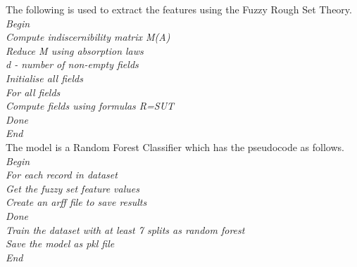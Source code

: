 The following is used to extract the features using the Fuzzy Rough Set Theory.\\
\null\quad\textit{Begin}\\
\null\quad\quad\textit{Compute indiscernibility matrix M(A)}\\
\null\quad\quad\textit{Reduce M using absorption laws}\\
\null\quad\quad\textit{d - number of non-empty fields}\\
\null\quad\quad\textit{Initialise all fields}\\
\null\quad\quad\textit{For all fields}\\
\null\quad\quad\quad\textit{Compute fields using formulas R=SUT}\\
\null\quad\quad\textit{Done}\\
\null\quad\textit{End}\\

The model is a Random Forest Classifier which has the pseudocode as follows.\\
\null\quad\textit{Begin}\\
\null\quad\quad\textit{For each record in dataset}\\
\null\quad\quad\quad\textit{Get the fuzzy set feature values}\\
\null\quad\quad\quad\textit{Create an arff file to save results}\\
\null\quad\quad\textit{Done}\\
\null\quad\quad\textit{Train the dataset with at least 7 splits as random forest}\\
\null\quad\quad\textit{Save the model as pkl file}\\
\null\quad\textit{End}\\

